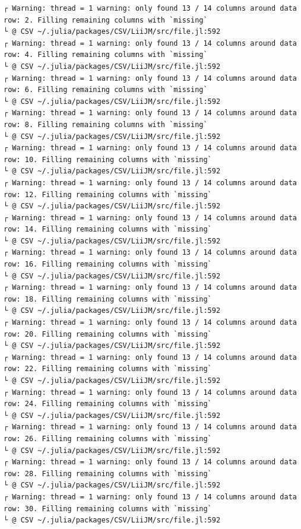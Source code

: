 \documentclass[
  letterpaper,
  DIV=11,
  numbers=noendperiod]{scrartcl}
\begin{document}
\begin{verbatim}
┌ Warning: thread = 1 warning: only found 13 / 14 columns around data row: 2. Filling remaining columns with `missing`
└ @ CSV ~/.julia/packages/CSV/LiiJM/src/file.jl:592
┌ Warning: thread = 1 warning: only found 13 / 14 columns around data row: 4. Filling remaining columns with `missing`
└ @ CSV ~/.julia/packages/CSV/LiiJM/src/file.jl:592
┌ Warning: thread = 1 warning: only found 13 / 14 columns around data row: 6. Filling remaining columns with `missing`
└ @ CSV ~/.julia/packages/CSV/LiiJM/src/file.jl:592
┌ Warning: thread = 1 warning: only found 13 / 14 columns around data row: 8. Filling remaining columns with `missing`
└ @ CSV ~/.julia/packages/CSV/LiiJM/src/file.jl:592
┌ Warning: thread = 1 warning: only found 13 / 14 columns around data row: 10. Filling remaining columns with `missing`
└ @ CSV ~/.julia/packages/CSV/LiiJM/src/file.jl:592
┌ Warning: thread = 1 warning: only found 13 / 14 columns around data row: 12. Filling remaining columns with `missing`
└ @ CSV ~/.julia/packages/CSV/LiiJM/src/file.jl:592
┌ Warning: thread = 1 warning: only found 13 / 14 columns around data row: 14. Filling remaining columns with `missing`
└ @ CSV ~/.julia/packages/CSV/LiiJM/src/file.jl:592
┌ Warning: thread = 1 warning: only found 13 / 14 columns around data row: 16. Filling remaining columns with `missing`
└ @ CSV ~/.julia/packages/CSV/LiiJM/src/file.jl:592
┌ Warning: thread = 1 warning: only found 13 / 14 columns around data row: 18. Filling remaining columns with `missing`
└ @ CSV ~/.julia/packages/CSV/LiiJM/src/file.jl:592
┌ Warning: thread = 1 warning: only found 13 / 14 columns around data row: 20. Filling remaining columns with `missing`
└ @ CSV ~/.julia/packages/CSV/LiiJM/src/file.jl:592
┌ Warning: thread = 1 warning: only found 13 / 14 columns around data row: 22. Filling remaining columns with `missing`
└ @ CSV ~/.julia/packages/CSV/LiiJM/src/file.jl:592
┌ Warning: thread = 1 warning: only found 13 / 14 columns around data row: 24. Filling remaining columns with `missing`
└ @ CSV ~/.julia/packages/CSV/LiiJM/src/file.jl:592
┌ Warning: thread = 1 warning: only found 13 / 14 columns around data row: 26. Filling remaining columns with `missing`
└ @ CSV ~/.julia/packages/CSV/LiiJM/src/file.jl:592
┌ Warning: thread = 1 warning: only found 13 / 14 columns around data row: 28. Filling remaining columns with `missing`
└ @ CSV ~/.julia/packages/CSV/LiiJM/src/file.jl:592
┌ Warning: thread = 1 warning: only found 13 / 14 columns around data row: 30. Filling remaining columns with `missing`
└ @ CSV ~/.julia/packages/CSV/LiiJM/src/file.jl:592

\end{verbatim}
\end{document}
